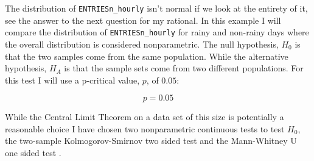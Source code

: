 \documentclass{article}
\numberwithin{questionCtr}{section}
\numberwithin{problemCtr}{section}
\begin{document}

The distribution of \verb|ENTRIESn_hourly| isn't normal if we look at the
entirety of it, see the answer to the next question for my rational.  In this
example I will compare the distribution of \verb|ENTRIESn_hourly| for rainy and
non-rainy days where the overall distribution is considered nonparametric.  The
null hypothesis, $H_0$ is that the two samples come from the same population.
While the alternative hypothesis, $H_A$ is that the sample sets come from two
different populations.  For this test I will use a p-critical value, $p$, of
$0.05$:

\begin{equation}
  p = 0.05
  \label{eq:p-critical-value}
\end{equation}

While the Central Limit Theorem on a data set of this size is potentially a
reasonable choice I have chosen two nonparametric continuous tests to test
$H_0$, the two-sample Kolmogorov-Smirnov two sided test
\cite{Scipy-Kolmogorov-Smirnov} and the Mann-Whitney U one sided test
\cite{Scipy-mannwhitney}.  
\end{document}
